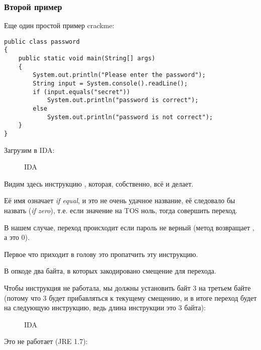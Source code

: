 \subsubsection{Второй пример}

Еще один простой пример crackme:

\begin{lstlisting}[style=customjava]
public class password
{
	public static void main(String[] args)
	{
		System.out.println("Please enter the password");
		String input = System.console().readLine();
		if (input.equals("secret"))
			System.out.println("password is correct");
		else
			System.out.println("password is not correct");
	}
}
\end{lstlisting}

Загрузим в IDA:

\begin{figure}[H]
\centering
{}
\caption{IDA}
\end{figure}


Видим здесь инструкцию , которая, собственно, всё и делает.

Её имя означает \emph{if equal}, и это не очень удачное название, её следовало бы назвать 
 (\emph{if zero}), т.е. если значение на \ac{TOS} ноль, тогда совершить переход.

В нашем случае, переход происходит если пароль не верный 
(метод  возвращает , а это 0).

Первое что приходит в голову это пропатчить эту инструкцию.

В опкоде  два байта, в которых закодировано смещение для перехода.

Чтобы инструкция не работала, мы должны установить байт 3 на третьем байте
(потому что 3 будет прибавляться к текущему смещению, и в итоге переход будет на следующую инструкцию,
ведь длина инструкции  это 3 байта):

\begin{figure}[H]
\centering
{}
\caption{IDA}
\end{figure}

Это не работает (JRE 1.7):

